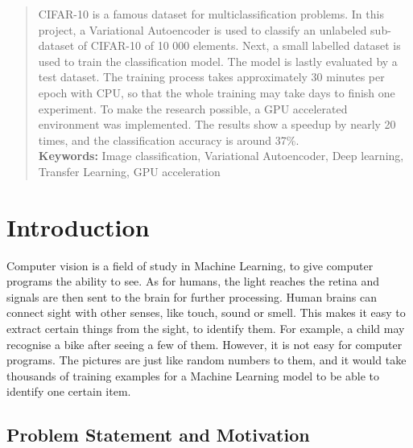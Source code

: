 \documentclass[11pt,a4paper]{report}
\begin{document}
\begin{abstract}




CIFAR-10 is a famous dataset for multiclassification problems. In this project, a Variational Autoencoder is used to classify an unlabeled sub-dataset of CIFAR-10 of 10 000 elements. Next, a small labelled dataset is used to train the classification model. The model is lastly evaluated by a test dataset. The training process takes approximately 30 minutes per epoch with CPU, so that the whole training may take days to finish one experiment. To make the research possible, a GPU accelerated environment was implemented. The results show a speedup by nearly 20 times, and the classification accuracy is around 37\%. \\

\textbf{Keywords:} Image classification, Variational Autoencoder, Deep learning, Transfer Learning, GPU acceleration


\end{abstract}


\tableofcontents
\glsaddall
\printglossary[type=\acronymtype]
\printglossary[type=main,title={Glossary},toctitle={Glossary}]

\chapter{Introduction}
\label{chap:introduction}

Computer vision is a field of study in Machine Learning, to give computer programs the ability to see. As for humans, the light reaches the retina and signals are then sent to the brain for further processing. Human brains can connect sight with other senses, like touch, sound or smell. This makes it easy to extract certain things from the sight, to identify them. For example, a child may recognise a bike after seeing a few of them. However, it is not easy for computer programs. The pictures are just like random numbers to them, and it would take thousands of training examples for a Machine Learning model to be able to identify one certain item.


\section{Problem Statement and Motivation}
\label{sec:motivation}
\end{document}

